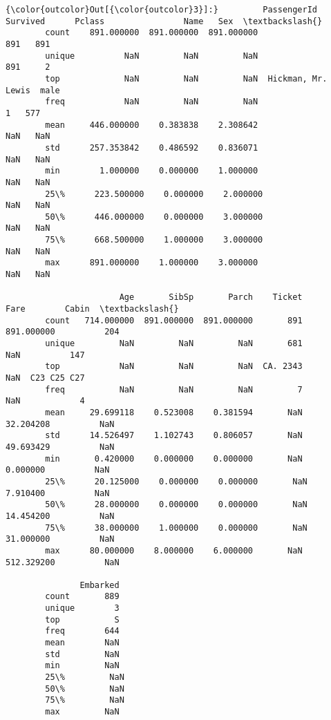 \documentclass[11pt]{article}
\begin{document}
\begin{Verbatim}[commandchars=\\\{\}]
{\color{outcolor}Out[{\color{outcolor}3}]:}         PassengerId    Survived      Pclass                Name   Sex  \textbackslash{}
        count    891.000000  891.000000  891.000000                 891   891   
        unique          NaN         NaN         NaN                 891     2   
        top             NaN         NaN         NaN  Hickman, Mr. Lewis  male   
        freq            NaN         NaN         NaN                   1   577   
        mean     446.000000    0.383838    2.308642                 NaN   NaN   
        std      257.353842    0.486592    0.836071                 NaN   NaN   
        min        1.000000    0.000000    1.000000                 NaN   NaN   
        25\%      223.500000    0.000000    2.000000                 NaN   NaN   
        50\%      446.000000    0.000000    3.000000                 NaN   NaN   
        75\%      668.500000    1.000000    3.000000                 NaN   NaN   
        max      891.000000    1.000000    3.000000                 NaN   NaN   
        
                       Age       SibSp       Parch    Ticket        Fare        Cabin  \textbackslash{}
        count   714.000000  891.000000  891.000000       891  891.000000          204   
        unique         NaN         NaN         NaN       681         NaN          147   
        top            NaN         NaN         NaN  CA. 2343         NaN  C23 C25 C27   
        freq           NaN         NaN         NaN         7         NaN            4   
        mean     29.699118    0.523008    0.381594       NaN   32.204208          NaN   
        std      14.526497    1.102743    0.806057       NaN   49.693429          NaN   
        min       0.420000    0.000000    0.000000       NaN    0.000000          NaN   
        25\%      20.125000    0.000000    0.000000       NaN    7.910400          NaN   
        50\%      28.000000    0.000000    0.000000       NaN   14.454200          NaN   
        75\%      38.000000    1.000000    0.000000       NaN   31.000000          NaN   
        max      80.000000    8.000000    6.000000       NaN  512.329200          NaN   
        
               Embarked  
        count       889  
        unique        3  
        top           S  
        freq        644  
        mean        NaN  
        std         NaN  
        min         NaN  
        25\%         NaN  
        50\%         NaN  
        75\%         NaN  
        max         NaN  
\end{Verbatim}
            
\end{document}
